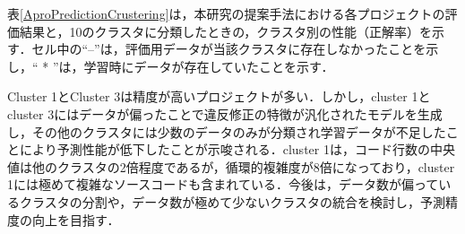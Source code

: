 \documentclass[T,J]{fose} %
\newcommand{\todo}[1]{\colorbox{yellow}{{\bf TODO}:}{\color{red} {\textbf{[#1]}}}}
\begin{document}
%
%
%
%
%
表\ref{AproPredictionCrustering}は，本研究の提案手法における各プロジェクトの評価結果と，10のクラスタに分類したときの，クラスタ別の性能（正解率）を示す．セル中の``--''は，評価用データが当該クラスタに存在しなかったことを示し，`` * ''は，学習時にデータが存在していたことを示す．

Cluster 1とCluster 3は精度が高いプロジェクトが多い．しかし，cluster 1とcluster 3にはデータが偏ったことで違反修正の特徴が汎化されたモデルを生成し，その他のクラスタには少数のデータのみが分類され学習データが不足したことにより予測性能が低下したことが示唆される．cluster 1は，コード行数の中央値は他のクラスタの2倍程度であるが，循環的複雑度が8倍になっており，cluster 1には極めて複雑なソースコードも含まれている．今後は，データ数が偏っているクラスタの分割や，データ数が極めて少ないクラスタの統合を検討し，予測精度の向上を目指す．







\end{document}
